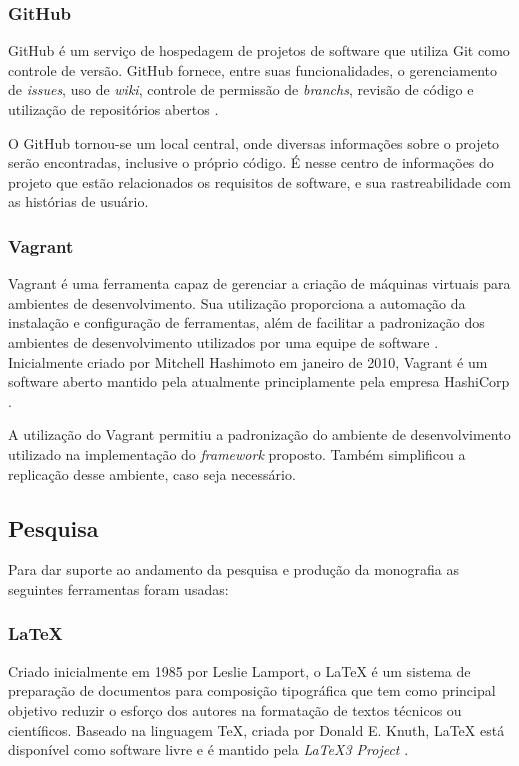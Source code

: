 \begin{apendicesenv}
\subsubsection{GitHub}
GitHub é um serviço de hospedagem de projetos de software que utiliza Git como controle de versão. GitHub fornece, entre suas funcionalidades, o gerenciamento de \textit{issues}, uso de \textit{wiki}, controle de permissão de \textit{branchs}, revisão de código e utilização de repositórios abertos \cite{gitlab}.
\par
\indent O GitHub tornou-se um local central, onde diversas informações sobre o projeto serão encontradas, inclusive o próprio código. É nesse centro de informações do projeto que estão relacionados os requisitos de software, e sua rastreabilidade com as histórias de usuário.

\subsubsection{Vagrant}
Vagrant é uma ferramenta capaz de gerenciar a criação de máquinas virtuais para ambientes de desenvolvimento. Sua utilização proporciona a automação da instalação e configuração de ferramentas, além de facilitar a padronização dos ambientes de desenvolvimento utilizados por uma equipe de software \cite{vagrant2015}. Inicialmente criado por Mitchell Hashimoto em janeiro de 2010, Vagrant é um software aberto mantido pela atualmente principlamente pela empresa HashiCorp \cite{vagrant2015}. 

A utilização do Vagrant permitiu a padronização do ambiente de desenvolvimento utilizado na implementação do \textit{framework} proposto. Também simplificou a replicação desse ambiente, caso seja necessário.

\subsection{Pesquisa}
Para dar suporte ao andamento da pesquisa e produção da monografia as seguintes ferramentas foram usadas:

\subsubsection{LaTeX}
Criado inicialmente em 1985 por Leslie Lamport, o LaTeX é um sistema de preparação de documentos para composição tipográfica que tem como principal objetivo reduzir o esforço dos autores na formatação de textos técnicos ou científicos. Baseado na linguagem TeX, criada por Donald E. Knuth, LaTeX está disponível como software livre e é mantido pela \textit{LaTeX3 Project} \cite{latex2015}.


\end{apendicesenv}
